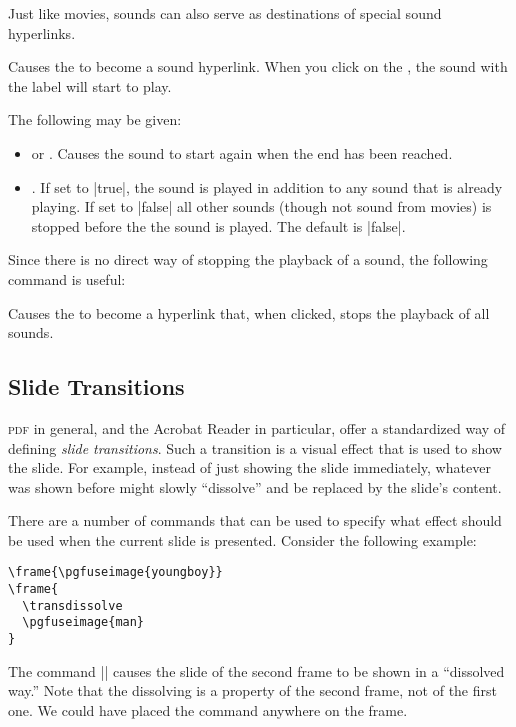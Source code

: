 Just like movies, sounds can also serve as  destinations of special
sound hyperlinks. 

\begin{command}{\hyperlinksound{}}
  Causes the  to become a sound hyperlink. When you click
  on the , the sound with the label  will
  start to play.

  The following  may be given:
  \begin{itemize}
  \item
     or . Causes the sound to start
    again when the end has been reached.
  \item
    . If set to |true|, the
    sound is played in addition to any sound that is already
    playing. If set to |false| all other sounds (though not sound from
    movies) is stopped before the the sound is played. The default is
    |false|. 
  \end{itemize}
\end{command}

Since there is no direct way of stopping the playback of a sound, the
following command is useful:


\begin{command}{\hyperlinkmute{}}
  Causes the  to become a hyperlink that, when clicked,
  stops the playback of all sounds.
\end{command}




\subsection{Slide Transitions}

\textsc{pdf} in general, and the Acrobat Reader in particular, offer a
standardized way of defining \emph{slide transitions}. Such a
transition is a visual effect that is used to show the slide. For
example, instead of just showing the slide immediately, whatever was
shown before might slowly ``dissolve'' and be replaced by the slide's
content.

There are a number of commands that can be used to specify what effect
should be used when the current slide is presented. Consider the
following example:

\begin{verbatim}
\frame{\pgfuseimage{youngboy}}
\frame{
  \transdissolve
  \pgfuseimage{man}
}
\end{verbatim}
The command |\transdissolve| causes the slide of the
second frame to be shown in a ``dissolved way.'' Note that the
dissolving is a property of the second frame, not of the first one. We
could have placed the command anywhere on the frame.

